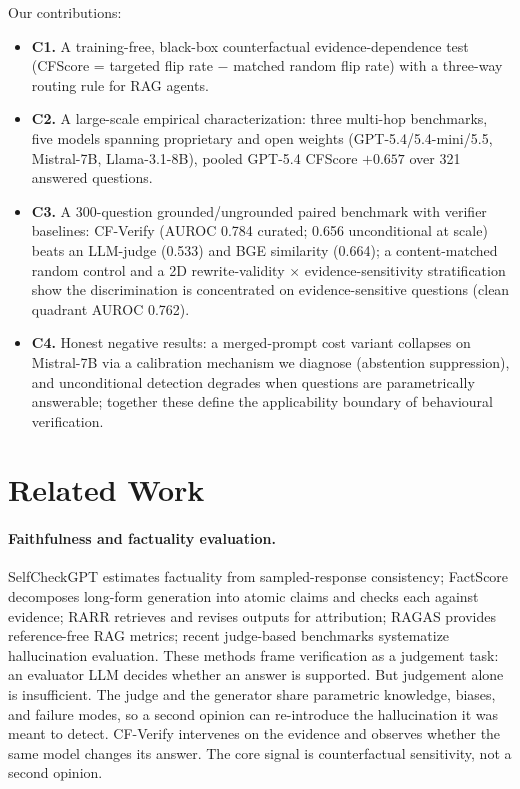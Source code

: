 \documentclass[11pt]{article}
\begin{document}
Our contributions:
\begin{itemize}\itemsep0pt
\item \textbf{C1.} A training-free, black-box counterfactual evidence-dependence test (CFScore = targeted flip rate $-$ matched random flip rate) with a three-way routing rule for RAG agents.
\item \textbf{C2.} A large-scale empirical characterization: three multi-hop benchmarks, five models spanning proprietary and open weights (GPT-5.4/5.4-mini/5.5, Mistral-7B, Llama-3.1-8B), pooled GPT-5.4 CFScore $+0.657$ over 321 answered questions.
\item \textbf{C3.} A 300-question grounded/ungrounded paired benchmark with verifier baselines: CF-Verify (AUROC 0.784 curated; 0.656 unconditional at scale) beats an LLM-judge (0.533) and BGE similarity (0.664); a content-matched random control and a 2D rewrite-validity $\times$ evidence-sensitivity stratification show the discrimination is concentrated on evidence-sensitive questions (clean quadrant AUROC 0.762).
\item \textbf{C4.} Honest negative results: a merged-prompt cost variant collapses on Mistral-7B via a calibration mechanism we diagnose (abstention suppression), and unconditional detection degrades when questions are parametrically answerable; together these define the applicability boundary of behavioural verification.
\end{itemize}

\section{Related Work}
\label{sec:related}

\paragraph{Faithfulness and factuality evaluation.}
SelfCheckGPT \cite{selfcheckgpt} estimates factuality from sampled-response consistency; FactScore \cite{factscore} decomposes long-form generation into atomic claims and checks each against evidence; RARR \cite{rarr} retrieves and revises outputs for attribution; RAGAS \cite{ragas} provides reference-free RAG metrics; recent judge-based benchmarks \cite{tamber2025faithjudge} systematize hallucination evaluation. These methods frame verification as a judgement task: an evaluator LLM decides whether an answer is supported. But judgement alone is insufficient. The judge and the generator share parametric knowledge, biases, and failure modes, so a second opinion can re-introduce the hallucination it was meant to detect. CF-Verify intervenes on the evidence and observes whether the same model changes its answer. The core signal is counterfactual sensitivity, not a second opinion.
\end{document}
